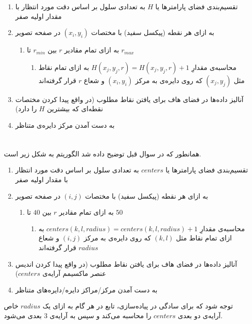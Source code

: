 \documentclass{article}
\begin{document}
\begin{enumerate}
	\item تقسیم‌بندی فضای پارامترها یا $H$ به تعدادی سلول بر اساس دقت مورد انتظار با مقدار اولیه صفر
	\item به ازای هر نقطه (پیکسل سفید) با مختصات 
$(x_{i}, y_{i})$
 در صفحه تصویر
    \begin{enumerate}
		\item به ازای تمام مقادیر $r$ بین $r_{min}$ تا $r_{max}$
		\begin{enumerate}
			\item محاسبه‌ی مقدارِ
$H(x_{j}, y_{j}, r) = H(x_{j}, y_{j}, r) + 1$ به ازای تمام نقاط مثل $(x_{j}, y_{j})$ که روی دایره‌ی به مرکز $(x_{i}, y_{i})$ و شعاع $r$ قرار گرفته‌اند
		\end{enumerate}
    \end{enumerate}
    \item آنالیز داده‌ها در فضای هاف برای یافتن نقاط مطلوب (در واقع پیدا کردن مختصات نقطه‌ای که بیشترین $H$ را دارد)
    \item به دست آمدن مرکز دایره‌ی متناظر
\end{enumerate}


\section{}%
\subsection{}
همانطور که در سوال قبل توضیح داده شد الگوریتم به شکل زیر است.
\begin{enumerate}
	\item تقسیم‌بندی فضای پارامترها یا $centers$ به تعدادی سلول بر اساس دقت مورد انتظار با مقدار اولیه صفر
	\item به ازای هر نقطه (پیکسل سفید) با مختصات 
$(i, j)$
 در صفحه تصویر
    \begin{enumerate}
		\item به ازای تمام مقادیر $r$ بین $40$ تا $50$
		\begin{enumerate}
			\item محاسبه‌ی مقدارِ
$centers(k, l, radius) = centers(k, l, radius) + 1$ به ازای تمام نقاط مثل $(k, l)$ که روی دایره‌ی به مرکز $(i, j)$ و شعاع $radius$ قرار گرفته‌اند
		\end{enumerate}
    \end{enumerate}
    \item آنالیز داده‌ها در فضای هاف برای یافتن نقاط مطلوب (در واقع پیدا کردن اندیس عنصر ماکسیمم آرایه‌ی $centers$)
    \item به دست آمدن مرکز/مراکز دایره‌/دایره‌های متناظر
\end{enumerate}
توجه شود که برای سادگی در پیاده‌سازی، تابع  در هر گام به ازای یک $radius$ خاص آرایه‌ی دو بعدی $centers$ را محاسبه می‌کند و سپس به آرایه‌ی 3 بعدی  می‌شود.
\end{document}
